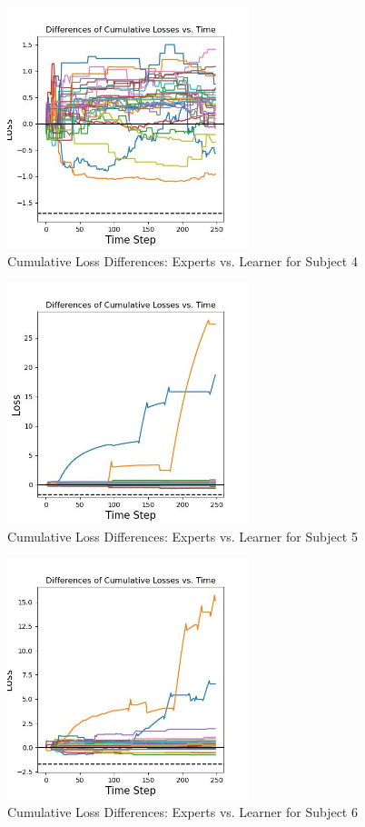 \begin{figure}[ht]
    \centering
    \includegraphics[width=0.625\textwidth]{images/ME_differences.jpg}
    \caption{Cumulative Loss Differences: Experts vs. Learner for Subject 4}
\end{figure}
\begin{figure}[h!]
    \centering
    \includegraphics[width=0.625\textwidth]{images/NJ_differences.jpg}
    \caption{Cumulative Loss Differences: Experts vs. Learner for Subject 5}
\end{figure}
\begin{figure}[ht]
    \centering
    \includegraphics[width=0.625\textwidth]{images/RM_differences.jpg}
    \caption{Cumulative Loss Differences: Experts vs. Learner for Subject 6}
\end{figure}
